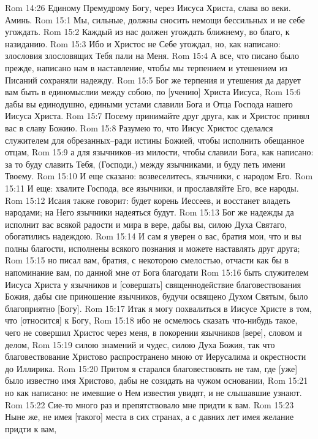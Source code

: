 Rom 14:26  Единому Премудрому Богу, через Иисуса Христа, слава во веки. Аминь.
Rom 15:1  Мы, сильные, должны сносить немощи бессильных и не себе угождать.
Rom 15:2  Каждый из нас должен угождать ближнему, во благо, к назиданию.
Rom 15:3  Ибо и Христос не Себе угождал, но, как написано: злословия злословящих Тебя пали на Меня.
Rom 15:4  А все, что писано было прежде, написано нам в наставление, чтобы мы терпением и утешением из Писаний сохраняли надежду.
Rom 15:5  Бог же терпения и утешения да дарует вам быть в единомыслии между собою, по [учению] Христа Иисуса,
Rom 15:6  дабы вы единодушно, едиными устами славили Бога и Отца Господа нашего Иисуса Христа.
Rom 15:7  Посему принимайте друг друга, как и Христос принял вас в славу Божию.
Rom 15:8  Разумею то, что Иисус Христос сделался служителем для обрезанных--ради истины Божией, чтобы исполнить обещанное отцам,
Rom 15:9  а для язычников--из милости, чтобы славили Бога, как написано: за то буду славить Тебя, (Господи,) между язычниками, и буду петь имени Твоему.
Rom 15:10  И еще сказано: возвеселитесь, язычники, с народом Его.
Rom 15:11  И еще: хвалите Господа, все язычники, и прославляйте Его, все народы.
Rom 15:12  Исаия также говорит: будет корень Иессеев, и восстанет владеть народами; на Него язычники надеяться будут.
Rom 15:13  Бог же надежды да исполнит вас всякой радости и мира в вере, дабы вы, силою Духа Святаго, обогатились надеждою.
Rom 15:14  И сам я уверен о вас, братия мои, что и вы полны благости, исполнены всякого познания и можете наставлять друг друга;
Rom 15:15  но писал вам, братия, с некоторою смелостью, отчасти как бы в напоминание вам, по данной мне от Бога благодати
Rom 15:16  быть служителем Иисуса Христа у язычников и [совершать] священнодействие благовествования Божия, дабы сие приношение язычников, будучи освящено Духом Святым, было благоприятно [Богу].
Rom 15:17  Итак я могу похвалиться в Иисусе Христе в том, что [относится] к Богу,
Rom 15:18  ибо не осмелюсь сказать что-нибудь такое, чего не совершил Христос через меня, в покорении язычников [вере], словом и делом,
Rom 15:19  силою знамений и чудес, силою Духа Божия, так что благовествование Христово распространено мною от Иерусалима и окрестности до Иллирика.
Rom 15:20  Притом я старался благовествовать не там, где [уже] было известно имя Христово, дабы не созидать на чужом основании,
Rom 15:21  но как написано: не имевшие о Нем известия увидят, и не слышавшие узнают.
Rom 15:22  Сие-то много раз и препятствовало мне придти к вам.
Rom 15:23  Ныне же, не имея [такого] места в сих странах, а с давних лет имея желание придти к вам,
